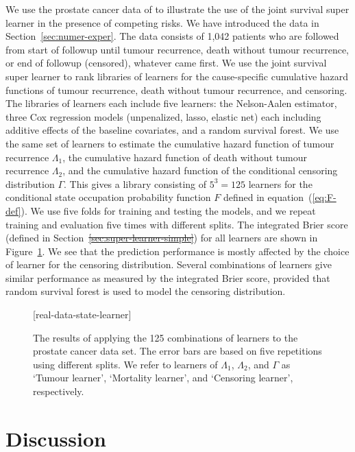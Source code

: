 \documentclass[lineno]{biometrika}
\newcommand{\1}{\mathds{1}}
\providecommand{\DIFadd}[1]{{\protect\color{blue}\uwave{#1}}} %
\providecommand{\DIFdel}[1]{{\protect\color{red}\sout{#1}}}                      %
\providecommand{\DIFaddbegin}{} %
\providecommand{\DIFaddend}{} %
\providecommand{\DIFdelbegin}{} %
\providecommand{\DIFdelend}{} %
\begin{document}
We use the prostate cancer data of \cite{kattan2000pretreatment} to
illustrate the use of the joint survival super learner in the presence
of competing risks. We have introduced the data in
Section~\ref{sec:numer-exper}. The data consists of 1,042 patients who
are followed from start of followup until tumour recurrence, death
without tumour recurrence, or end of followup (censored), whatever
came first. We use the joint survival super learner to rank libraries
of learners for the cause-specific cumulative hazard functions of
tumour recurrence, death without tumour recurrence, and censoring. The
libraries of learners each include five learners: the Nelson-Aalen
estimator, three Cox regression models (unpenalized, lasso, elastic
net) each including additive effects of the baseline covariates, and a
random survival forest. We use the same set of learners to estimate
the cumulative hazard function of tumour recurrence \( \Lambda_1 \),
the cumulative hazard function of death without tumour recurrence
\( \Lambda_2 \), and the cumulative hazard function of the conditional
censoring distribution $\Gamma$. This gives a library consisting of
\( 5^3 = 125 \) learners for the conditional state occupation
probability function \( F \) defined in equation~(\ref{eq:F-def}). We
use five folds for training and testing the models, and we repeat
training and evaluation five times with different splits. The
integrated Brier score (defined in
Section~\DIFdelbegin \DIFdel{\ref{sec:super-learner-simple}}\DIFdelend \DIFaddbegin \DIFadd{\ref{sec:joint-survival-super-learner}}\DIFaddend ) for all learners are shown in
Figure~\ref{fig:zelefski-real}. We see that the prediction performance
is mostly affected by the choice of learner for the censoring
distribution. Several combinations of learners give similar
performance as measured by the integrated Brier score, provided that
random survival forest is used to model the censoring distribution.

\begin{figure}
\figurebox{20pc}{25pc}{}[real-data-state-learner]
\caption{The results of applying the 125 combinations of learners to the
    prostate cancer data set. The error bars are based on five repetitions using
    different splits. We refer to learners of \( \Lambda_1 \), \( \Lambda_2 \),
    and $\Gamma$ as `Tumour learner', `Mortality learner', and `Censoring
    learner', respectively.}
\label{fig:zelefski-real}
\end{figure}


\section{Discussion}
\label{sec:discussion}
\end{document}
